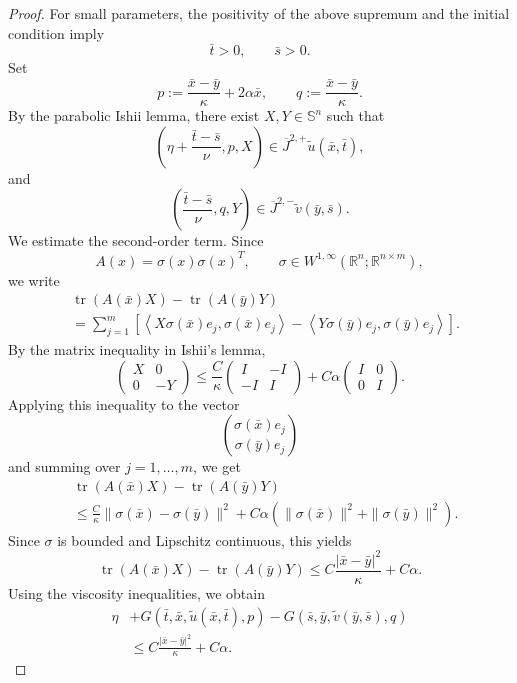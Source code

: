 \documentclass[10pt,a4paper]{amsart}
\begin{document}
\begin{proof}
For small parameters, the positivity of the above supremum and the initial condition imply
\[
 \bar t>0,
 \qquad
 \bar s>0.
\]
Set
\[
 p:=\frac{\bar x-\bar y}{\kappa}+2\alpha\bar x,
 \qquad
 q:=\frac{\bar x-\bar y}{\kappa}.
\]
By the parabolic Ishii lemma, there exist \(X,Y\in\mathbb S^n\) such that
\[
 \left(
 \eta+\frac{\bar t-\bar s}{\nu},
 p,
 X
 \right)
 \in
 \overline{J}^{2,+}\widetilde u(\bar x,\bar t),
\]
and
\[
 \left(
 \frac{\bar t-\bar s}{\nu},
 q,
 Y
 \right)
 \in
 \overline{J}^{2,-}\widetilde v(\bar y,\bar s).
\]
We estimate the second-order term. Since
\[
 A(x)=\sigma(x)\sigma(x)^T,
 \qquad
 \sigma\in W^{1,\infty}(\mathbb R^n;\mathbb R^{n\times m}),
\]
we write
\[
\begin{aligned}
&\operatorname{tr}(A(\bar x)X)-\operatorname{tr}(A(\bar y)Y)\\
&=
\sum_{j=1}^m
\left[
\left\langle X\sigma(\bar x)e_j,\sigma(\bar x)e_j\right\rangle
-
\left\langle Y\sigma(\bar y)e_j,\sigma(\bar y)e_j\right\rangle
\right].
\end{aligned}
\]
By the matrix inequality in Ishii's lemma,
\[
 \begin{pmatrix}
 X & 0\\
 0 & -Y
 \end{pmatrix}
 \le
 \frac{C}{\kappa}
 \begin{pmatrix}
 I & -I\\
 -I & I
 \end{pmatrix}
 +
 C\alpha
 \begin{pmatrix}
 I & 0\\
 0 & I
 \end{pmatrix}.
\]
Applying this inequality to the vector
\[
 \binom{\sigma(\bar x)e_j}{\sigma(\bar y)e_j}
\]
and summing over \(j=1,\dots,m\), we get
\[
\begin{aligned}
&\operatorname{tr}(A(\bar x)X)-\operatorname{tr}(A(\bar y)Y)\\
&\le
\frac{C}{\kappa}
\|\sigma(\bar x)-\sigma(\bar y)\|^2
+
C\alpha
\left(
\|\sigma(\bar x)\|^2+\|\sigma(\bar y)\|^2
\right).
\end{aligned}
\]
Since \(\sigma\) is bounded and Lipschitz continuous, this yields
\[
 \operatorname{tr}(A(\bar x)X)-\operatorname{tr}(A(\bar y)Y)
 \le
 C\frac{|\bar x-\bar y|^2}{\kappa}+C\alpha.
\]
Using the viscosity inequalities, we obtain
\[
\begin{aligned}
 \eta
 &+
 G(\bar t,\bar x,\widetilde u(\bar x,\bar t),p)
 -
 G(\bar s,\bar y,\widetilde v(\bar y,\bar s),q) \\
 &\le
 C\frac{|\bar x-\bar y|^2}{\kappa}+C\alpha.

\end{aligned}\]
\end{proof}
\end{document}
